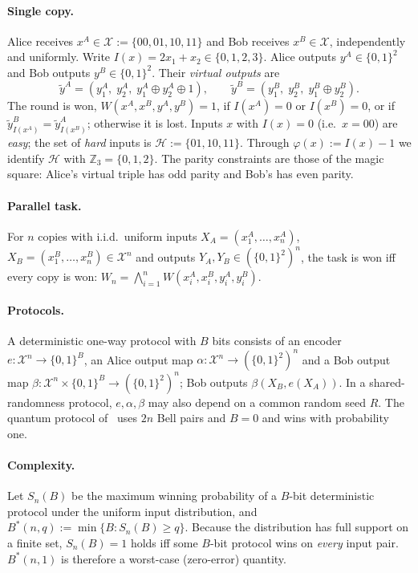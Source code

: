 \documentclass[12pt,a4paper]{article}
\theoremstyle{definition}
\theoremstyle{remark}
\newcommand{\Z}{\mathbb{Z}}
\newcommand{\Bstar}{B^{*}}
\newcommand{\ytA}{\tilde{y}^{A}}
\newcommand{\ytB}{\tilde{y}^{B}}
\newcommand{\xor}{\oplus}
\newcommand{\Hd}{\mathcal{H}}   %
\newcommand{\Xall}{\mathcal{X}} %
\begin{document}
\paragraph{Single copy.} Alice receives $x^A \in \Xall := \{00,01,10,11\}$ and Bob receives $x^B \in \Xall$, independently and uniformly. Write $I(x) = 2x_1 + x_2 \in \{0,1,2,3\}$. Alice outputs $y^A \in \{0,1\}^2$ and Bob outputs $y^B \in \{0,1\}^2$. Their \emph{virtual outputs} are
\[
  \ytA = (y_1^A,\; y_2^A,\; y_1^A \xor y_2^A \xor 1), \qquad
  \ytB = (y_1^B,\; y_2^B,\; y_1^B \xor y_2^B).
\]
The round is won, $W(x^A,x^B,y^A,y^B)=1$, if $I(x^A)=0$ or $I(x^B)=0$, or if $\ytB_{I(x^A)} = \ytA_{I(x^B)}$; otherwise it is lost. Inputs $x$ with $I(x)=0$ (i.e.\ $x=00$) are \emph{easy}; the set of \emph{hard} inputs is $\Hd := \{01,10,11\}$. Through $\varphi(x) := I(x)-1$ we identify $\Hd$ with $\Z_3 = \{0,1,2\}$. The parity constraints are those of the magic square: Alice's virtual triple has odd parity and Bob's has even parity.

\paragraph{Parallel task.} For $n$ copies with i.i.d.\ uniform inputs $X_A = (x_1^A,\dots,x_n^A)$, $X_B = (x_1^B,\dots,x_n^B) \in \Xall^n$ and outputs $Y_A, Y_B \in (\{0,1\}^2)^n$, the task is won iff every copy is won: $W_n = \bigwedge_{i=1}^n W(x_i^A,x_i^B,y_i^A,y_i^B)$.

\paragraph{Protocols.} A deterministic one-way protocol with $B$ bits consists of an encoder $e:\Xall^n \to \{0,1\}^B$, an Alice output map $\alpha:\Xall^n \to (\{0,1\}^2)^n$ and a Bob output map $\beta:\Xall^n\times\{0,1\}^B \to (\{0,1\}^2)^n$; Bob outputs $\beta(X_B, e(X_A))$. In a shared-randomness protocol, $e,\alpha,\beta$ may also depend on a common random seed $R$. The quantum protocol of~\cite{zhaodeng2025} uses $2n$ Bell pairs and $B=0$ and wins with probability one.

\paragraph{Complexity.} Let $S_n(B)$ be the maximum winning probability of a $B$-bit deterministic protocol under the uniform input distribution, and $\Bstar(n,q) := \min\{B : S_n(B) \ge q\}$. Because the distribution has full support on a finite set, $S_n(B)=1$ holds iff some $B$-bit protocol wins on \emph{every} input pair. $\Bstar(n,1)$ is therefore a worst-case (zero-error) quantity.
\end{document}
